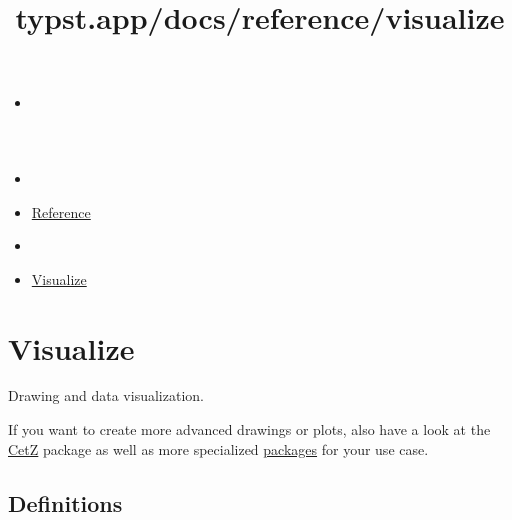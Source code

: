 \title{typst.app/docs/reference/visualize}

\begin{itemize}
\tightlist
\item
  \href{/docs}{}
\item
  
\item
  \href{/docs/reference/}{Reference}
\item
  
\item
  \href{/docs/reference/visualize/}{Visualize}
\end{itemize}

\section{Visualize}\label{summary}

Drawing and data visualization.

If you want to create more advanced drawings or plots, also have a look
at the \href{https://github.com/johannes-wolf/cetz}{CetZ} package as
well as more specialized \href{https://typst.app/universe/}{packages}
for your use case.

\subsection{Definitions}\label{definitions}

